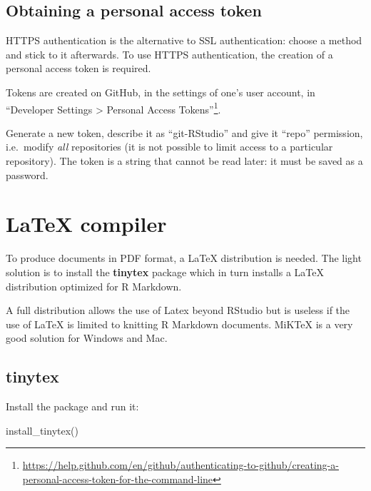 \documentclass[
  12pt,
  american,
  a4paper,
  extrafontsizes,onecolumn,openright
  ]{memoir}
\newenvironment{Shaded}{\begin{snugshade}}{\end{snugshade}}
\newcommand{\FunctionTok}[1]{\textcolor[rgb]{0.00,0.00,0.00}{#1}}
\newcommand{\NormalTok}[1]{#1}
\begin{document}
\hypertarget{sec:pat}{%
\subsection{Obtaining a personal access token}\label{sec:pat}}

HTTPS authentication is the alternative to SSL authentication: choose a method and stick to it afterwards.
To use HTTPS authentication, the creation of a personal access token is required.

Tokens are created on GitHub, in the settings of one's user account, in \enquote{Developer Settings \textgreater{} Personal Access Tokens}\footnote{\url{https://help.github.com/en/github/authenticating-to-github/creating-a-personal-access-token-for-the-command-line}}.

Generate a new token, describe it as \enquote{git-RStudio} and give it \enquote{repo} permission, i.e.~modify \emph{all} repositories (it is not possible to limit access to a particular repository).
The token is a string that cannot be read later: it must be saved as a password.

\hypertarget{latex-compiler}{%
\section{LaTeX compiler}\label{latex-compiler}}

To produce documents in PDF format, a LaTeX distribution is needed.
The light solution is to install the \textbf{tinytex} package which in turn installs a LaTeX distribution optimized for R Markdown.

A full distribution allows the use of Latex beyond RStudio but is useless if the use of LaTeX is limited to knitting R Markdown documents.
MiKTeX is a very good solution for Windows and Mac.

\hypertarget{tinytex}{%
\subsection{tinytex}\label{tinytex}}

Install the package and run it:

\scriptsize

\begin{Shaded}
\begin{Highlighting}[]
\FunctionTok{install\_tinytex}\NormalTok{()}
\end{Highlighting}
\end{Shaded}
\end{document}
